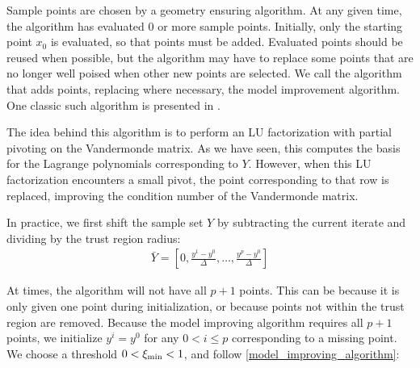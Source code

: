 Sample points are chosen by a geometry ensuring algorithm.
At any given time, the algorithm has evaluated 0 or more sample points.
Initially, only the starting point $x_0$ is evaluated, so that points must be added.
Evaluated points should be reused when possible, but the algorithm may have to replace some points that are no longer well poised when other new points are selected.
We call the algorithm that adds points, replacing where necessary, the model improvement algorithm.
One classic such algorithm is presented in \cite{DUMMY:intro_book}.

The idea behind this algorithm is to perform an LU factorization with partial pivoting on the Vandermonde matrix.
As we have seen, this computes the basis for the Lagrange polynomials corresponding to $Y$.
However, when this LU factorization encounters a small pivot, the point corresponding to that row is replaced, improving the condition number of the Vandermonde matrix.

In practice, we first shift the sample set $Y$ by subtracting the current iterate and dividing by the trust region radius:
\begin{align}
\bar{Y} = [0, \frac{y^1 - y^0}{\Delta}, \ldots, \frac{y^p - y^0}{\Delta}]
\end{align}

At times, the algorithm will not have all $p+1$ points.
This can be because it is only given one point during initialization, or because points not within the trust region are removed.
Because the model improving algorithm requires all $p+1$ points, we initialize $y^i = y^0$ for any $0 < i \le p$ corresponding to a missing point.
We choose a threshold $0 < \xi_{\text{min}} < 1$, and follow \cref{model_improving_algorithm}:

